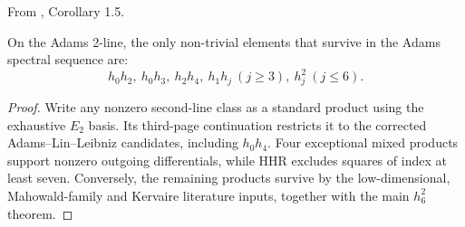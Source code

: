 \begin{corollary}
\label{paper:1.5}
From \cite{LWX126}, Corollary 1.5.\par
\label{cor:2line}
    On the Adams 2-line, the only non-trivial elements that survive in the Adams spectral sequence are:
    $$h_0h_2, \ h_0h_3, \ h_2h_4, \ h_1h_j \ (j \geq 3), \ h_j^2 \ (j \leq 6).$$


\end{corollary}
\begin{proof}
Write any nonzero second-line class as a standard product using the exhaustive $E_2$ basis. Its third-page continuation restricts it to the corrected Adams--Lin--Leibniz candidates, including $h_0h_4$. Four exceptional mixed products support nonzero outgoing differentials, while HHR excludes squares of index at least seven. Conversely, the remaining products survive by the low-dimensional, Mahowald-family and Kervaire literature inputs, together with the main $h_6^2$ theorem.
\end{proof}



